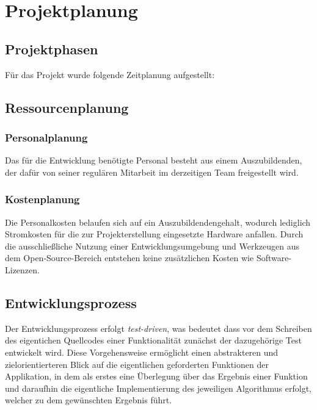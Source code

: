 \section{Projektplanung}
\label{sec:Projektplanung}


\subsection{Projektphasen}
\label{sec:Projektphasen}
Für das Projekt wurde folgende Zeitplanung aufgestellt:


\subsection{Ressourcenplanung}
\label{sec:Ressourcenplanung}
\subsubsection{Personalplanung}
\label{sec:Personalplanung}
Das für die Entwicklung benötigte Personal besteht aus einem Auszubildenden, der dafür von seiner
regulären Mitarbeit im derzeitigen Team freigestellt wird.
\subsubsection{Kostenplanung}
\label{sec:Kostenplanung}
Die Personalkosten belaufen sich auf ein Auszubildendengehalt, wodurch lediglich Stromkosten für die
zur Projekterstellung eingesetzte Hardware anfallen. Durch die ausschließliche Nutzung einer
Entwicklungsumgebung und Werkzeugen aus dem Open-Source-Bereich entstehen keine zusätzlichen Kosten
wie Software-Lizenzen.

\subsection{Entwicklungsprozess}
\label{sec:Entwicklungsprozess}
Der Entwicklungsprozess erfolgt \textit{test-driven}, was bedeutet dass vor dem Schreiben des eigentichen
Quellcodes einer Funktionalität zunächst der dazugehörige Test entwickelt wird. Diese Vorgehensweise
ermöglicht einen abstrakteren und zielorientierteren Blick auf die eigentlichen geforderten
Funktionen der Applikation, in dem als erstes eine Überlegung über das Ergebnis einer Funktion
und daraufhin die eigentliche Implementierung des jeweiligen Algorithmus erfolgt, welcher zu dem
gewünschten Ergebnis führt.

